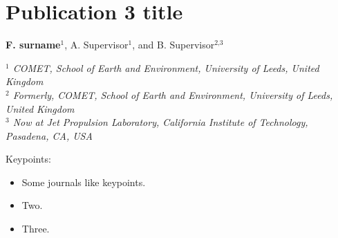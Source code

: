 \onehalfspacing
\chapter[Publication 3 title]{Publication 3 title}
\label{ch:publication3}
\begin{center}
 \large{\textbf{F. surname}$^{\text{1}}$, A. Supervisor$^{\text{1}}$, and B. Supervisor$^{\text{2,3}}$}  \\
\end{center}
\begin{center}
\textit{
$^{\text{1}}$ COMET, School of Earth and Environment, University of Leeds, United Kingdom\\
$^{\text{2}}$ Formerly, COMET, School of Earth and Environment, University of Leeds, United Kingdom\\
$^{\text{3}}$ Now at Jet Propulsion Laboratory, California Institute of Technology, Pasadena, CA, USA\\
}
\end{center}

\newpage
Keypoints:
\begin{itemize}
\item Some journals like keypoints.
\item Two.
\item Three.
\end{itemize}



